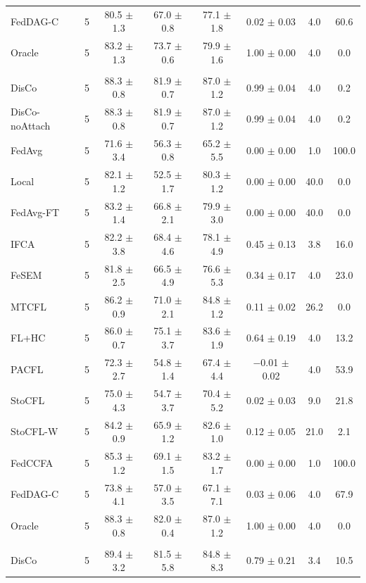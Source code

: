 {{\begin{tabular}{l r c c c c c c}
FedDAG-C & 5 & 80.5 $\pm$ 1.3 & 67.0 $\pm$ 0.8 & 77.1 $\pm$ 1.8 & 0.02 $\pm$ 0.03 & 4.0 & 60.6 \\
Oracle & 5 & 83.2 $\pm$ 1.3 & 73.7 $\pm$ 0.6 & 79.9 $\pm$ 1.6 & 1.00 $\pm$ 0.00 & 4.0 & 0.0 \\
\addlinespace
\multicolumn{8}{l}{\textit{CIFAR-10 (ResNet) label swap}} \\
DisCo & 5 & 88.3 $\pm$ 0.8 & 81.9 $\pm$ 0.7 & 87.0 $\pm$ 1.2 & 0.99 $\pm$ 0.04 & 4.0 & 0.2 \\
DisCo-noAttach & 5 & 88.3 $\pm$ 0.8 & 81.9 $\pm$ 0.7 & 87.0 $\pm$ 1.2 & 0.99 $\pm$ 0.04 & 4.0 & 0.2 \\
FedAvg & 5 & 71.6 $\pm$ 3.4 & 56.3 $\pm$ 0.8 & 65.2 $\pm$ 5.5 & 0.00 $\pm$ 0.00 & 1.0 & 100.0 \\
Local & 5 & 82.1 $\pm$ 1.2 & 52.5 $\pm$ 1.7 & 80.3 $\pm$ 1.2 & 0.00 $\pm$ 0.00 & 40.0 & 0.0 \\
FedAvg-FT & 5 & 83.2 $\pm$ 1.4 & 66.8 $\pm$ 2.1 & 79.9 $\pm$ 3.0 & 0.00 $\pm$ 0.00 & 40.0 & 0.0 \\
IFCA & 5 & 82.2 $\pm$ 3.8 & 68.4 $\pm$ 4.6 & 78.1 $\pm$ 4.9 & 0.45 $\pm$ 0.13 & 3.8 & 16.0 \\
FeSEM & 5 & 81.8 $\pm$ 2.5 & 66.5 $\pm$ 4.9 & 76.6 $\pm$ 5.3 & 0.34 $\pm$ 0.17 & 4.0 & 23.0 \\
MTCFL & 5 & 86.2 $\pm$ 0.9 & 71.0 $\pm$ 2.1 & 84.8 $\pm$ 1.2 & 0.11 $\pm$ 0.02 & 26.2 & 0.0 \\
FL+HC & 5 & 86.0 $\pm$ 0.7 & 75.1 $\pm$ 3.7 & 83.6 $\pm$ 1.9 & 0.64 $\pm$ 0.19 & 4.0 & 13.2 \\
PACFL & 5 & 72.3 $\pm$ 2.7 & 54.8 $\pm$ 1.4 & 67.4 $\pm$ 4.4 & $-$0.01 $\pm$ 0.02 & 4.0 & 53.9 \\
StoCFL & 5 & 75.0 $\pm$ 4.3 & 54.7 $\pm$ 3.7 & 70.4 $\pm$ 5.2 & 0.02 $\pm$ 0.03 & 9.0 & 21.8 \\
StoCFL-W & 5 & 84.2 $\pm$ 0.9 & 65.9 $\pm$ 1.2 & 82.6 $\pm$ 1.0 & 0.12 $\pm$ 0.05 & 21.0 & 2.1 \\
FedCCFA & 5 & 85.3 $\pm$ 1.2 & 69.1 $\pm$ 1.5 & 83.2 $\pm$ 1.7 & 0.00 $\pm$ 0.00 & 1.0 & 100.0 \\
FedDAG-C & 5 & 73.8 $\pm$ 4.1 & 57.0 $\pm$ 3.5 & 67.1 $\pm$ 7.1 & 0.03 $\pm$ 0.06 & 4.0 & 67.9 \\
Oracle & 5 & 88.3 $\pm$ 0.8 & 82.0 $\pm$ 0.4 & 87.0 $\pm$ 1.2 & 1.00 $\pm$ 0.00 & 4.0 & 0.0 \\
\addlinespace
\multicolumn{8}{l}{\textit{AG News label swap}} \\
DisCo & 5 & 89.4 $\pm$ 3.2 & 81.5 $\pm$ 5.8 & 84.8 $\pm$ 8.3 & 0.79 $\pm$ 0.21 & 3.4 & 10.5 \\

\end{tabular}}}

